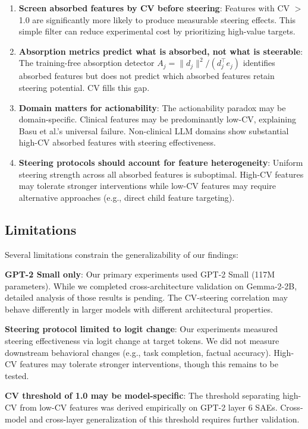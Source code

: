 \documentclass{article}
\begin{document}
\begin{enumerate}
    \item \textbf{Screen absorbed features by CV before steering}: Features with CV $>$ 1.0 are significantly more likely to produce measurable steering effects. This simple filter can reduce experimental cost by prioritizing high-value targets.

    \item \textbf{Absorption metrics predict what is absorbed, not what is steerable}: The training-free absorption detector $A_j = \|d_j\|^2 / (d_j^\top e_j)$ identifies absorbed features but does not predict which absorbed features retain steering potential. CV fills this gap.

    \item \textbf{Domain matters for actionability}: The actionability paradox may be domain-specific. Clinical features may be predominantly low-CV, explaining Basu et al.'s universal failure. Non-clinical LLM domains show substantial high-CV absorbed features with steering effectiveness.

    \item \textbf{Steering protocols should account for feature heterogeneity}: Uniform steering strength across all absorbed features is suboptimal. High-CV features may tolerate stronger interventions while low-CV features may require alternative approaches (e.g., direct child feature targeting).
\end{enumerate}

\subsection{Limitations}

Several limitations constrain the generalizability of our findings:

\textbf{GPT-2 Small only}: Our primary experiments used GPT-2 Small (117M parameters). While we completed cross-architecture validation on Gemma-2-2B, detailed analysis of those results is pending. The CV-steering correlation may behave differently in larger models with different architectural properties.

\textbf{Steering protocol limited to logit change}: Our experiments measured steering effectiveness via logit change at target tokens. We did not measure downstream behavioral changes (e.g., task completion, factual accuracy). High-CV features may tolerate stronger interventions, though this remains to be tested.

\textbf{CV threshold of 1.0 may be model-specific}: The threshold separating high-CV from low-CV features was derived empirically on GPT-2 layer 6 SAEs. Cross-model and cross-layer generalization of this threshold requires further validation.
\end{document}
